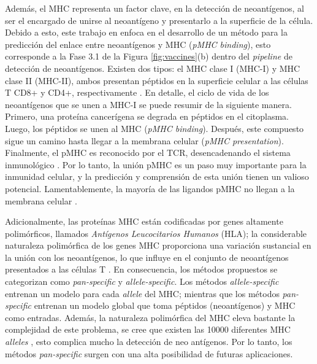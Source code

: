 Además, el MHC representa un factor clave, en la detección de neoantígenos, al ser el encargado de unirse al neoantígeno y presentarlo a la superficie de la célula. Debido a esto, este trabajo en enfoca en el desarrollo de un método para la predicción del enlace entre neoantígenos y MHC (\textit{pMHC binding}), esto corresponde a la Fase 3.1 de la Figura \ref{fig:vaccines}(b) dentro del \textit{pipeline} de detección de neoantígenos.  Existen dos tipos: el MHC clase I (MHC-I) y MHC clase II (MHC-II), ambos presentan péptidos en la superficie celular a las células T CD8+ y CD4+, respectivamente \citep{janeway1997immunobiology, abualrous2021major}. En detalle, el ciclo de vida de los neoantígenos que se unen a MHC-I se puede resumir de la siguiente manera. Primero, una proteína cancerígena se degrada en péptidos en el citoplasma. Luego, los péptidos se unen al MHC (\textit{pMHC binding}). Después, este compuesto sigue un camino hasta llegar a la membrana celular (\textit{pMHC presentation}). Finalmente, el pMHC es reconocido por el TCR, desencadenando el sistema inmunológico \citep{janeway1997immunobiology, wieczorek2017major, gasser2021interpreting}. Por lo tanto, la unión pMHC es un paso muy importante para la inmunidad celular, y la predicción y comprensión de esta unión tienen un valioso potencial. Lamentablemente, la mayoría de las ligandos pMHC no llegan a la membrana celular \citep{de2020neoantigen}. 

Adicionalmente, las proteínas MHC están codificadas por genes altamente polimórficos, llamados \textit{Antígenos Leucocitarios Humanos} (HLA); la considerable naturaleza polimórfica de los genes MHC proporciona una variación sustancial en la unión con los neoantígenos, lo que influye en el conjunto de neoantígenos presentados a las células T \citep{abualrous2021major}. En consecuencia, los métodos propuestos se categorizan como \textit{pan-specific} y \textit{allele-specific}. Los métodos \textit{allele-specific} \citep{rammensee1999syfpeithi, reche2002prediction, kim2009derivation, nielsen2016netmhcpan, vang2017hla, shao2020high, bravi2021rbm} entrenan un modelo para cada \textit{allele} del MHC; mientras que los métodos \textit{pan-specific} \citep{hu2019acme, liu2019deepseqpan, wu2019deephlapan, phloyphisut2019mhcseqnet, o2018mhcflurry, o2020mhcflurry, reynisson2020netmhcpan, venkatesh2020mhcattnnet, ye2021mathla, mei2021anthem, chu2022transformer, zhang2022hlab, mei2021anthem, hu2019acme, gfeller2023improved} entrenan un modelo global que toma péptidos (neoantígenos) y MHC como entradas. Además, la naturaleza polimórfica del MHC eleva bastante la complejidad de este problema, se cree que existen las 10000 diferentes MHC \textit{alleles} \citep{abelin2017mass}, esto complica mucho la detección de neo antígenos. Por lo tanto, los métodos \textit{pan-specific} surgen con una alta posibilidad de futuras aplicaciones.


